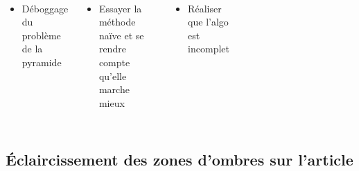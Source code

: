 \begin{frame}[fragile=singleslide]{\insertsectionhead}
  \framesubtitle{\insertsubsectionhead}
  \begin{columns}[T,onlytextwidth]
      \begin{itemize}
        \item Déboggage du problème de la pyramide
      \end{itemize}
      \hfill
      \begin{itemize}
        \item Essayer la méthode naïve et se rendre compte qu'elle marche mieux
      \end{itemize}
      \hfill
      \begin{itemize}
        \item Réaliser que l'algo est incomplet
      \end{itemize}
    \begin{figure}
        \begin{subfigure}{0.6\textwidth}
        \end{subfigure}
      \end{figure}
  \end{columns}
\end{frame}

\subsection{Éclaircissement des zones d'ombres sur l'article}

